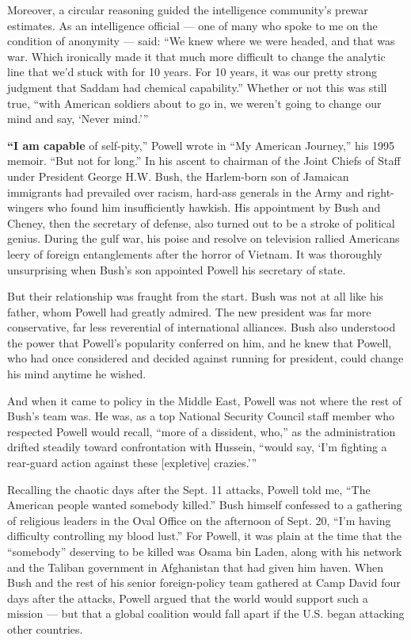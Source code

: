 Moreover, a circular reasoning guided the intelligence community's
prewar estimates. As an intelligence official --- one of many who spoke
to me on the condition of anonymity --- said: ``We knew where we were
headed, and that was war. Which ironically made it that much more
difficult to change the analytic line that we'd stuck with for 10 years.
For 10 years, it was our pretty strong judgment that Saddam had chemical
capability.'' Whether or not this was still true, ``with American
soldiers about to go in, we weren't going to change our mind and say,
`Never mind.'''

\textbf{``I am capable} of self-pity,'' Powell wrote in ``My American
Journey,'' his 1995 memoir. ``But not for long.'' In his ascent to
chairman of the Joint Chiefs of Staff under President George H.W. Bush,
the Harlem-born son of Jamaican immigrants had prevailed over racism,
hard-ass generals in the Army and right-wingers who found him
insufficiently hawkish. His appointment by Bush and Cheney, then the
secretary of defense, also turned out to be a stroke of political
genius. During the gulf war, his poise and resolve on television rallied
Americans leery of foreign entanglements after the horror of Vietnam. It
was thoroughly unsurprising when Bush's son appointed Powell his
secretary of state.

But their relationship was fraught from the start. Bush was not at all
like his father, whom Powell had greatly admired. The new president was
far more conservative, far less reverential of international alliances.
Bush also understood the power that Powell's popularity conferred on
him, and he knew that Powell, who had once considered and decided
against running for president, could change his mind anytime he wished.

And when it came to policy in the Middle East, Powell was not where the
rest of Bush's team was. He was, as a top National Security Council
staff member who respected Powell would recall, ``more of a dissident,
who,'' as the administration drifted steadily toward confrontation with
Hussein, ``would say, `I'm fighting a rear-guard action against these
{[}expletive{]} crazies.'''

Recalling the chaotic days after the Sept. 11 attacks, Powell told me,
``The American people wanted somebody killed.'' Bush himself confessed
to a gathering of religious leaders in the Oval Office on the afternoon
of Sept. 20, ``I'm having difficulty controlling my blood lust.'' For
Powell, it was plain at the time that the ``somebody'' deserving to be
killed was Osama bin Laden, along with his network and the Taliban
government in Afghanistan that had given him haven. When Bush and the
rest of his senior foreign-policy team gathered at Camp David four days
after the attacks, Powell argued that the world would support such a
mission --- but that a global coalition would fall apart if the U.S.
began attacking other countries.

